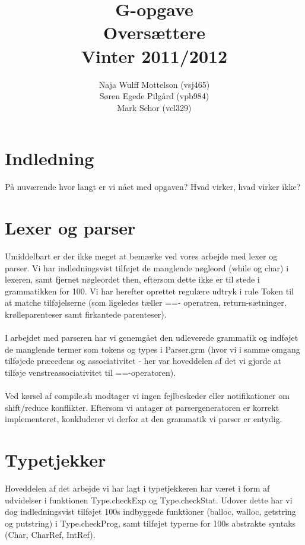 \documentclass[10pt,a4paper,danish]{article}
\title{G-opgave \\Oversættere\\Vinter 2011/2012}
\author{Naja Wulff Mottelson (vsj465) \\
        Søren Egede Pilgård (vpb984) \\
        Mark Schor (vcl329)}
\begin{document}
\maketitle
\newpage

\tableofcontents
\newpage

\section{Indledning}
På nuværende hvor langt er vi nået med opgaven? Hvad virker, hvad virker ikke?

\section{Lexer og parser}
Umiddelbart er der ikke meget at bemærke ved vores arbejde med lexer og 
parser. Vi har indledningsvist tilføjet de manglende nøgleord (while og char) i 
lexeren, samt fjernet nøgleordet then, eftersom dette ikke er til stede i
grammatikken for 100. Vi har herefter oprettet regulære udtryk i 
rule Token  til at matche tilføjelserne (som ligeledes tæller ==-
operatren, return-sætninger, krølleparenteser samt firkantede parenteser). 

\paragraph{}
I arbejdet  med parseren har vi genemgået den udleverede grammatik 
og indføjet de manglende termer som tokens og types i Parser.grm
(hvor vi i samme omgang tilføjede præcedens og associativitet - 
her var hoveddelen af det vi gjorde at tilføje venstreassociativitet 
til ==-operatoren).

\paragraph{}
Ved kørsel af compile.sh modtager vi ingen fejlbeskeder eller 
notifikationer om shift/reduce konflikter. Eftersom vi antager at 
parsergeneratoren er korrekt implementeret, konkluderer vi derfor at den 
grammatik vi parser er entydig. 

\section{Typetjekker}
Hoveddelen af det arbejde vi har lagt i typetjekkeren har været i form
af udvidelser i funktionen Type.checkExp og Type.checkStat.
Udover dette har vi dog indledningsvist tilføjet 100s indbyggede
funktioner (balloc, walloc, getstring og putstring) i Type.checkProg, samt 
tilføjet typerne for 100s abstrakte syntaks (Char, CharRef, IntRef).
 
\end{document}
